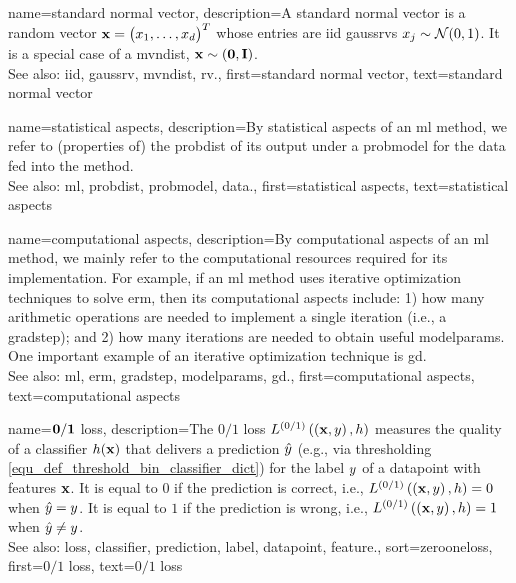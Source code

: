 {name={standard normal vector}, 
	description={A standard normal vector is a random vector ${\bf x}=\big(x_{1}, \ldots, x_{d}\big)^{T}$ 
		whose entries are \gls{iid} \glspl{gaussrv} $x_{j} \sim \mathcal{N}(0,1)$. 
		It is a special case of a \gls{mvndist}, ${\bf x} \sim \mathcal(\mathbf{0},\mathbf{I})$.
		\\ 
		See also: \gls{iid}, \gls{gaussrv}, \gls{mvndist}, \gls{rv}.}, 
	first={standard normal vector},
	text={standard normal vector}
}

{name={statistical aspects}, 
	description={By statistical aspects 
		of an \gls{ml} method, we refer to (properties of) the \gls{probdist} of its output 
		under a \gls{probmodel} for the \gls{data} fed into the method.
					\\ 
		See also: \gls{ml}, \gls{probdist}, \gls{probmodel}, \gls{data}.},
	first={statistical aspects},
	text={statistical aspects}
}

{name={computational aspects}, 
	description={By computational 
		aspects of an \gls{ml} method, we mainly refer to the computational 
		resources required for its implementation. For example, if an \gls{ml} method uses iterative 
		optimization techniques to solve \gls{erm}, then its computational aspects include: 1) how 
		many arithmetic operations are needed to implement a single iteration (i.e., a \gls{gradstep}); 
		and 2) how many iterations are needed to obtain useful \gls{modelparams}. One important 
		example of an iterative optimization technique is \gls{gd}.
					\\ 
		See also: \gls{ml}, \gls{erm}, \gls{gradstep}, \gls{modelparams}, \gls{gd}.}, 
	first={computational aspects},
	text={computational aspects}
}

{name={$\bf 0/1$ loss},
	description={The $0/1$ \gls{loss} $L^{(0/1)}\left(\left( {\bf x},y \right),h \right)$ 
		measures the quality of a \gls{classifier} $h({\bf x})$ that delivers a 
		\gls{prediction} $\hat{y}$ (e.g., via thresholding \eqref{equ_def_threshold_bin_classifier_dict}) 
		for the \gls{label} $y$ of a \gls{datapoint} with \glspl{feature} ${\bf x}$. It is equal to $0$ if 
		the \gls{prediction} is correct, i.e., 
		$L^{(0/1)}\left(\left( {\bf x},y \right),h \right)=0$ when $\hat{y}=y$. It is 
		equal to $1$ if the \gls{prediction} is wrong, i.e., $L^{(0/1)}\left(\left( {\bf x},y \right),h \right)=1$ 
		when $\hat{y}\neq y$.
				\\ 
		See also: \gls{loss}, \gls{classifier}, \gls{prediction}, \gls{label}, \gls{datapoint}, \gls{feature}.},
	sort=zerooneloss, 
    	first={$0/1$ loss},
	text={$0/1$ loss}
}


